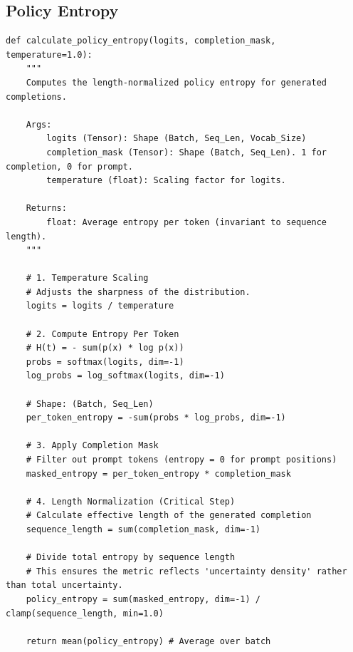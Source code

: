 \documentclass{article}
\begin{document}
\subsection{Policy Entropy}
\begin{lstlisting}[label={lst:policy_entropy}]
def calculate_policy_entropy(logits, completion_mask, temperature=1.0):
    """
    Computes the length-normalized policy entropy for generated completions.
    
    Args:
        logits (Tensor): Shape (Batch, Seq_Len, Vocab_Size)
        completion_mask (Tensor): Shape (Batch, Seq_Len). 1 for completion, 0 for prompt.
        temperature (float): Scaling factor for logits.
    
    Returns:
        float: Average entropy per token (invariant to sequence length).
    """
    
    # 1. Temperature Scaling
    # Adjusts the sharpness of the distribution.
    logits = logits / temperature

    # 2. Compute Entropy Per Token
    # H(t) = - sum(p(x) * log p(x))
    probs = softmax(logits, dim=-1)
    log_probs = log_softmax(logits, dim=-1)
    
    # Shape: (Batch, Seq_Len)
    per_token_entropy = -sum(probs * log_probs, dim=-1)

    # 3. Apply Completion Mask
    # Filter out prompt tokens (entropy = 0 for prompt positions)
    masked_entropy = per_token_entropy * completion_mask

    # 4. Length Normalization (Critical Step)
    # Calculate effective length of the generated completion
    sequence_length = sum(completion_mask, dim=-1)
    
    # Divide total entropy by sequence length
    # This ensures the metric reflects 'uncertainty density' rather than total uncertainty.
    policy_entropy = sum(masked_entropy, dim=-1) / clamp(sequence_length, min=1.0)

    return mean(policy_entropy) # Average over batch
\end{lstlisting}
\end{document}
